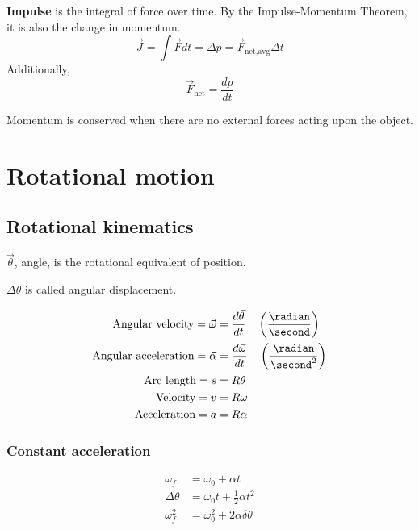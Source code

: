 \begin{definition}[Impulse] \textbf{Impulse} is the integral of force over time. By the Impulse-Momentum Theorem, it is also the change in momentum.
	\[
		\vec{J} = \int \vec{F} dt = \Delta p = \vec{F}_\text{net,avg} \Delta t
	\]
	Additionally,
	\[
		\vec{F}_\text{net} = \frac{dp}{dt}
	\]
\end{definition}

\begin{theorem}
	Momentum is conserved when there are no external forces acting upon the object.
\end{theorem}

\section{Rotational motion}

\subsection{Rotational kinematics}

$\vec{\theta}$, angle, is the rotational equivalent of position.

$\Delta \theta$ is called angular displacement.

\begin{align*}
\text{Angular velocity} = \vec{\omega} &= \frac{d\vec{\theta}}{dt} \quad \left(\frac{\radian}{\second}\right) \\
\text{Angular acceleration} = \vec{\alpha} &= \frac{d\vec{\omega}}{dt} \quad \left(\frac{\radian}{\second^2}\right) \\
\text{Arc length} = s &= R \theta \\
\text{Velocity} = v &= R \omega \\
\text{Acceleration} = a &= R \alpha \\
\end{align*}

\subsubsection{Constant acceleration}

\begin{align*}
	\omega_f &= \omega_0 + \alpha t \\
	\Delta \theta &= \omega_0 t + \tfrac{1}{2} \alpha t^2 \\
	\omega_f^2& = \omega_0^2 + 2 \alpha \delta \theta
\end{align*}

